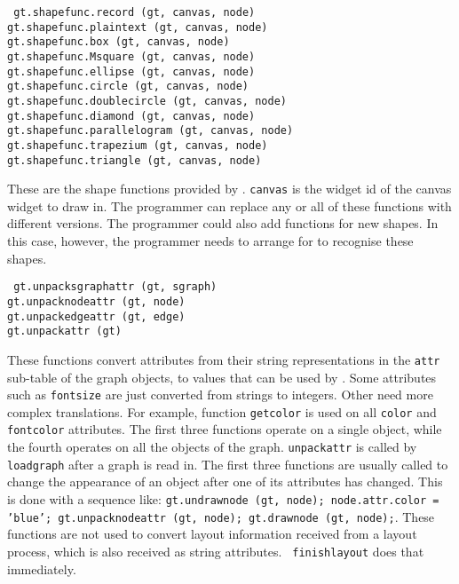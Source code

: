 \begin{flushleft}\tt
gt.shapefunc.record (gt, canvas, node)\\
gt.shapefunc.plaintext (gt, canvas, node)\\
gt.shapefunc.box (gt, canvas, node)\\
gt.shapefunc.Msquare (gt, canvas, node)\\
gt.shapefunc.ellipse (gt, canvas, node)\\
gt.shapefunc.circle (gt, canvas, node)\\
gt.shapefunc.doublecircle (gt, canvas, node)\\
gt.shapefunc.diamond (gt, canvas, node)\\
gt.shapefunc.parallelogram (gt, canvas, node)\\
gt.shapefunc.trapezium (gt, canvas, node)\\
gt.shapefunc.triangle (gt, canvas, node)\\
\end{flushleft}\vspace{-2\itemsep}
These are the shape functions provided by {\DOTTY}. {\tt canvas} is the widget
id of the canvas widget to draw in. The programmer can replace any or all of
these functions with different versions. The programmer could also add
functions for new shapes. In this case, however, the programmer needs to
arrange for {\DOT} to recognise these shapes.

\begin{flushleft}\tt
gt.unpacksgraphattr (gt, sgraph)\\
gt.unpacknodeattr (gt, node)\\
gt.unpackedgeattr (gt, edge)\\
gt.unpackattr (gt)\\
\end{flushleft}\vspace{-2\itemsep}
These functions convert attributes from their string representations in the
{\tt attr} sub-table of the graph objects, to values that can be used by
{\LEFTY}. Some attributes such as {\tt fontsize} are just converted from
strings to integers. Other need more complex translations. For example,
function {\tt getcolor} is used on all {\tt color} and {\tt fontcolor}
attributes. The first three functions operate on a single object, while the
fourth operates on all the objects of the graph. {\tt unpackattr} is called by
{\tt loadgraph} after a graph is read in. The first three functions are usually
called to change the appearance of an object after one of its attributes has
changed. This is done with a sequence like: {\tt gt.undrawnode (gt, node);
node.attr.color = 'blue'; gt.unpacknodeattr (gt, node); gt.drawnode (gt,
node);}. These functions are not used to convert layout information received
from a layout process, which is also received as {\DOT} string attributes. {\tt
finishlayout} does that immediately.

